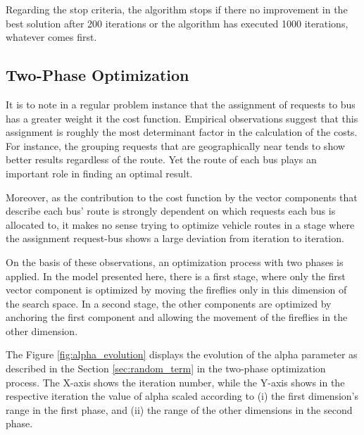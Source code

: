 \documentclass[tuberlin,cic,tc,openright,english,noabntcite,oneside]{iiufrgs}
\begin{document}
Regarding the stop criteria, the algorithm stops if there no improvement in the best solution after 200 iterations or the algorithm has executed 1000 iterations, whatever comes first.

\subsection{Two-Phase Optimization}
It is to note in a regular problem instance that the assignment of requests to bus has a greater weight it the cost function. Empirical observations suggest that this assignment is roughly the most determinant factor in the calculation of the costs. For instance, the grouping requests that are geographically near tends to show better results regardless of the route. Yet the route of each bus plays an important role in finding an optimal result.

Moreover, as the contribution to the cost function by the vector components that describe each bus' route is strongly dependent on which requests each bus is allocated to, it makes no sense trying to optimize vehicle routes in a stage where the assignment request-bus shows a large deviation from iteration to iteration.

On the basis of these observations, an optimization process with two phases is applied. In the model presented here, there is a first stage, where only the first vector component is optimized by moving the fireflies only in this dimension of the search space. In a second stage, the other components are optimized by anchoring the first component and allowing the movement of the fireflies in the other dimension.

The Figure \ref{fig:alpha_evolution} displays the evolution of the alpha parameter as described in the Section \ref{sec:random_term} in the two-phase optimization process. The X-axis shows the iteration number, while the Y-axis shows in the respective iteration the value of alpha scaled according to (i) the first dimension's range in the first phase, and (ii) the range of the other dimensions in the second phase.
\end{document}
